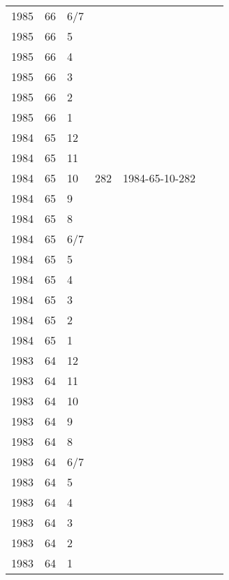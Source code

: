 \begin{longtable}{ |l|l|l|l|p{2.7cm}|l|p{2cm}| }
 1985 & 66 &   6/7 &         &                &  & \\
 1985 & 66 &     5 &         &                &  & \\
 1985 & 66 &     4 &         &                &  & \\
 1985 & 66 &     3 &         &                &  & \\
 1985 & 66 &     2 &         &                &  & \\
 1985 & 66 &     1 &         &                &  & \\
 1984 & 65 &    12 &         &                &  & \\
 1984 & 65 &    11 &         &                &  & \\
 1984 & 65 &    10 &     282 & 1984-65-10-282 &  & \\
 1984 & 65 &     9 &         &                &  & \\
 1984 & 65 &     8 &         &                &  & \\
 1984 & 65 &   6/7 &         &                &  & \\
 1984 & 65 &     5 &         &                &  & \\
 1984 & 65 &     4 &         &                &  & \\
 1984 & 65 &     3 &         &                &  & \\
 1984 & 65 &     2 &         &                &  & \\
 1984 & 65 &     1 &         &                &  & \\
 1983 & 64 &    12 &         &                &  & \\
 1983 & 64 &    11 &         &                &  & \\
 1983 & 64 &    10 &         &                &  & \\
 1983 & 64 &     9 &         &                &  & \\
 1983 & 64 &     8 &         &                &  & \\
 1983 & 64 &   6/7 &         &                &  & \\
 1983 & 64 &     5 &         &                &  & \\
 1983 & 64 &     4 &         &                &  & \\
 1983 & 64 &     3 &         &                &  & \\
 1983 & 64 &     2 &         &                &  & \\
 1983 & 64 &     1 &         &                &  & \\

\end{longtable}

